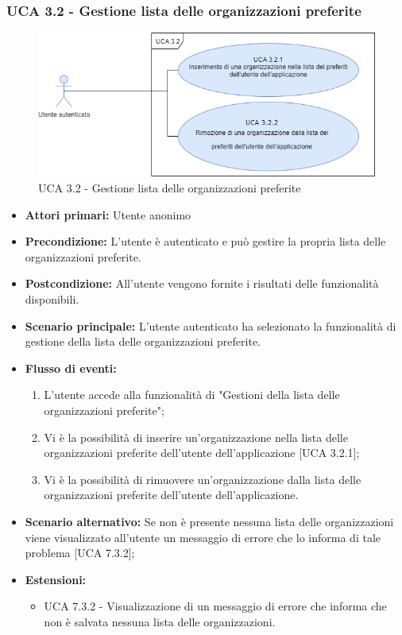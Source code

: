 \subsubsection{UCA 3.2 - Gestione lista delle organizzazioni preferite}%
\begin{figure}[h]
	\centering
	
	\includegraphics[scale=0.5]{sezioni/UseCase/Immagini/UCA3.2.png}
	\caption{UCA 3.2 - Gestione lista delle organizzazioni preferite}
\end{figure}
\begin{itemize}
	\item \textbf{Attori primari:} Utente anonimo
	\item \textbf{Precondizione:} L'utente è autenticato e può gestire la propria lista delle organizzazioni preferite.
	\item \textbf{Postcondizione:} All'utente vengono fornite i risultati delle funzionalità disponibili.
	\item \textbf{Scenario principale:} L'utente autenticato ha selezionato la funzionalità di gestione della lista delle organizzazioni preferite.
	\item \textbf{Flusso di eventi:}
			\begin{enumerate}
			\item L'utente accede alla funzionalità di "Gestioni della lista delle organizzazioni preferite";
			\item Vi è la possibilità di inserire un'organizzazione nella lista delle organizzazioni preferite dell'utente dell'applicazione [UCA 3.2.1];
			\item Vi è la possibilità di rimuovere un'organizzazione dalla lista delle organizzazioni preferite dell'utente dell'applicazione.
			\end{enumerate}
	\item \textbf{Scenario alternativo:} Se non è presente nessuna lista delle organizzazioni viene visualizzato all'utente un messaggio di errore che lo informa di tale problema [UCA 7.3.2];
	\item \textbf{Estensioni:}
	\begin{itemize}
		\item UCA 7.3.2 - Visualizzazione di un messaggio di errore che informa che non è salvata nessuna lista delle organizzazioni.
	\end{itemize}
\end{itemize}

